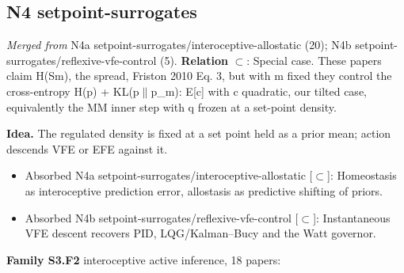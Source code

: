 \documentclass[10pt]{article}
\newcommand{\memb}[1]{\par\smallskip\textbf{#1}\quad}
\begin{document}
\subsection{N4 setpoint-surrogates}\label{node:S3-N4-setpoint-surrogates}
\textit{Merged from} N4a setpoint-surrogates/interoceptive-allostatic (20); N4b setpoint-surrogates/reflexive-vfe-control (5). \textbf{Relation} $\subset$: Special case. These papers claim H(S\textbar{}m), the spread, Friston 2010 Eq. 3, but with m fixed they control the cross-entropy H(p) + KL(p\ensuremath{\|}p\_m): E[c] with c quadratic, our tilted case, equivalently the MM inner step with q frozen at a set-point density.

\textbf{Idea.} The regulated density is fixed at a set point held as a prior mean; action descends VFE or EFE against it.
\begin{itemize}[nosep,leftmargin=1.2em]
\item Absorbed N4a setpoint-surrogates/interoceptive-allostatic [\ensuremath{\subset}]: Homeostasis as interoceptive prediction error, allostasis as predictive shifting of priors.
\item Absorbed N4b setpoint-surrogates/reflexive-vfe-control [\ensuremath{\subset}]: Instantaneous VFE descent recovers PID, LQG/Kalman--Bucy and the Watt governor.
\end{itemize}


\memb{Family S3.F2} interoceptive active inference, 18 papers: {\footnotesize \citetext{\citealp{Seth-interoceptive13}\dag; \citealp{Penny-dynamic14}; \citealp{Pezzulo-active15}; \citealp{Seth-cybernetic15}; \citealp{Barrett-active16}\dag; \citealp{Seth-active16}; \citealp{Stephan-allostatic16}; \citealp{Corcoran-allostatic20}; \citealp{Sennesh-interoception22}\dag; \citealp{Tschantz-simulating22}; \citealp{Bosulu-needing24}\dag; \citealp{Idei-future24}; \citealp{Khan-surprise24}; \citealp{Gu-interoceptive14}; \citealp{Barrett-theory17}; \citealp{Hesp-deeply21}; \citealp{Harrison-resilience25}; \citealp{Grimbly-interoceptive26}}}
\end{document}
